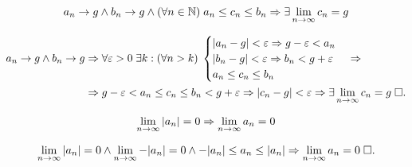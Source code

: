 \documentclass{article}
\begin{document}
\pagebreak

\begin{align*}
	a_{n}\to g\land b_{n}\to g\land (\forall n\in\mathbb{N})\;a_{n}\leq c_{n}\leq b_{n}\Rightarrow \exists\lim\limits_{n\to\infty} c_{n}=g
\end{align*}

\proof
\begin{align*}
	a_{n}\to g\land b_{n}\to g
	 & \Rightarrow\forall \varepsilon>0\;\exists k:(\forall n>k)\;
	\begin{cases}
		|a_{n}-g|<\varepsilon\Rightarrow g-\varepsilon<a_{n} \\
		|b_{n}-g|<\varepsilon\Rightarrow b_{n}<g+\varepsilon \\
		a_{n}\leq c_{n}\leq b_{n}
	\end{cases}\Rightarrow                                                                     \\
	 & \Rightarrow g-\varepsilon<a_{n}\leq c_{n}\leq b_{n}<g+\varepsilon\Rightarrow |c_{n}-g|<\varepsilon\Rightarrow \exists\lim\limits_{n\to\infty} c_{n}=g\;\square.
\end{align*}

\theorem
\begin{align*}
	\lim\limits_{n\to\infty} |a_{n}|=0\Rightarrow \lim\limits_{n\to\infty} a_{n}=0
\end{align*}

\proof
\begin{align*}
	\lim\limits_{n\to\infty} |a_{n}|=0\land\lim\limits_{n\to\infty} -|a_{n}|=0\land -|a_{n}|\leq a_{n}\leq |a_{n}|\Rightarrow \lim\limits_{n\to\infty} a_{n}=0\;\square.
\end{align*}
\end{document}
